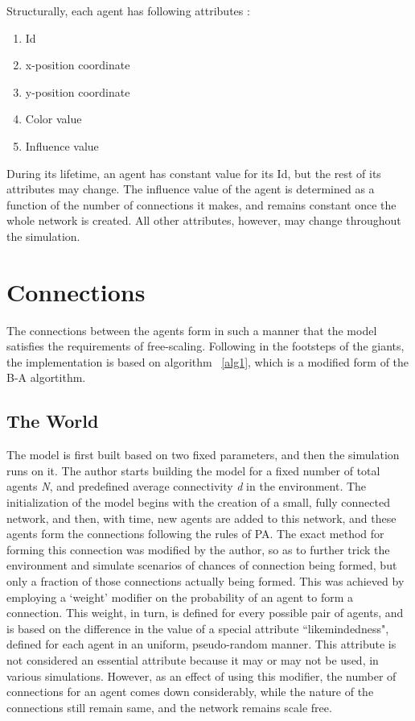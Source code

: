 Structurally, each agent has following attributes :

\begin{enumerate}
\item Id
\item x-position coordinate
\item y-position coordinate
\item Color value
\item Influence value
\end{enumerate}

During its lifetime, an agent has constant value for its Id, but the rest of its attributes may change. The influence value of the agent is determined as a function of the number of connections it makes, and remains constant once the whole network is created. All other attributes, however, may change throughout the simulation.


\section{Connections}
The connections between the agents form in such a manner that the model satisfies the requirements of free-scaling. 
Following in the footsteps of the giants, the implementation is based on algorithm ~\ref{alg1}, which is a modified form of the B-A algortithm.

\subsection{The World}
The model is first built based on two fixed parameters, and then the simulation runs on it.
The author starts building the model for a fixed number of total agents \emph{N}, and predefined average connectivity \emph{d} in the environment.
The initialization of the model begins with the creation of a small, fully connected network, and then, with time, new agents are added to this network, and these agents form the connections following the rules of PA.
The exact method for forming this connection was modified by the author, so as to further trick the environment and simulate scenarios of chances of connection being formed, but only a fraction of those connections actually being formed. This was achieved by employing a `weight' modifier on the probability of an agent to form a connection. This weight, in turn, is defined for every possible pair of agents, and is based on the difference in the value of a special attribute ``likemindedness", defined for each agent in an uniform, pseudo-random manner.
This attribute is not considered an essential attribute because it may or may not be used, in various simulations. However, as an effect of using this modifier, the number of connections for an agent comes down considerably, while the nature of the connections still remain same, and the network remains scale free.


